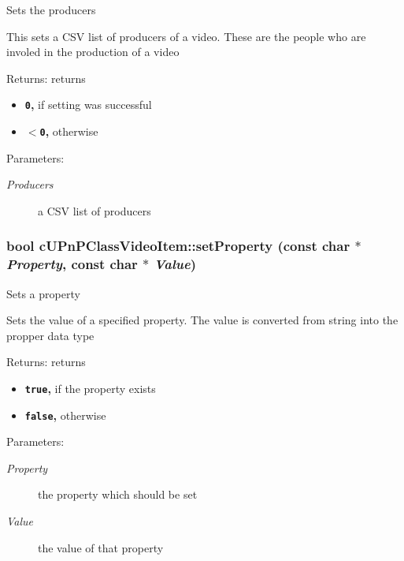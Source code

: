 Sets the producers

This sets a CSV list of producers of a video. These are the people who are involed in the production of a video

\begin{Desc}
\item[Returns:]returns\begin{itemize}
\item {\bf {\tt 0},} if setting was successful\item {\bf {\tt $<$0},} otherwise \end{itemize}
\end{Desc}
\begin{Desc}
\item[Parameters:]
\begin{description}
\item[{\em Producers}]a CSV list of producers \end{description}
\end{Desc}
\hypertarget{classcUPnPClassVideoItem_3cbda6d87f5a9ff0475a75e76ba19924}{
\subsubsection[{setProperty}]{\setlength{\rightskip}{0pt plus 5cm}bool cUPnPClassVideoItem::setProperty (const char $\ast$ {\em Property}, \/  const char $\ast$ {\em Value})}}
\label{classcUPnPClassVideoItem_3cbda6d87f5a9ff0475a75e76ba19924}


Sets a property

Sets the value of a specified property. The value is converted from string into the propper data type

\begin{Desc}
\item[Returns:]returns\begin{itemize}
\item {\bf {\tt true},} if the property exists\item {\bf {\tt false},} otherwise \end{itemize}
\end{Desc}
\begin{Desc}
\item[Parameters:]
\begin{description}
\item[{\em Property}]the property which should be set \item[{\em Value}]the value of that property \end{description}
\end{Desc}


